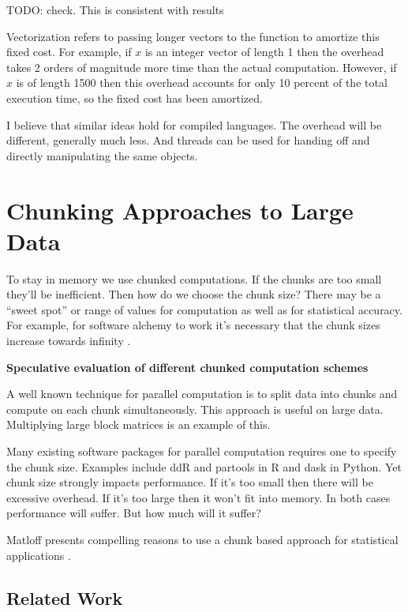 \documentclass[12pt]{article}
\begin{document}
TODO: check. This is consistent with results \cite{chambers2016extending}

Vectorization refers to passing longer vectors to the
function to amortize this fixed cost. For example, if $x$ is an integer
vector of length 1 then the overhead takes 2 orders of magnitude more time than
the actual computation. However, if $x$ is of length 1500 then this overhead
accounts for only 10 percent of the total execution time, so the fixed cost
has been amortized.

I believe that similar ideas hold for compiled languages. The overhead will
be different, generally much less. And threads can be used for handing off
and directly manipulating the same objects.

\section{Chunking Approaches to Large Data}

To stay in memory we use chunked computations. If the chunks are too small
they'll be inefficient. Then how do we choose the chunk size?  There may be
a ``sweet spot'' or range of values for computation as well as for
statistical accuracy. For example, for software alchemy to work it's
necessary that the chunk sizes increase towards infinity
\cite{matloff2014software}.



\textbf{Speculative evaluation of different chunked computation schemes}

A well known technique for parallel computation is to split data into
chunks and compute on each chunk simultaneously. This approach 
is useful on large data. Multiplying large block matrices is an example of this.

Many existing software packages for parallel computation requires one to specify the
chunk size. Examples include ddR \cite{R-ddR} and partools
\cite{R-partools} in R and dask in Python.
Yet chunk size strongly impacts
performance. If it's too small then there will be excessive overhead. If
it's too large then it won't fit into memory. In both cases performance
will suffer. But how much will it suffer?

Matloff presents compelling reasons to use a chunk based
approach for statistical applications \cite{matloff2014software}.

\subsection{Related Work}
\end{document}
